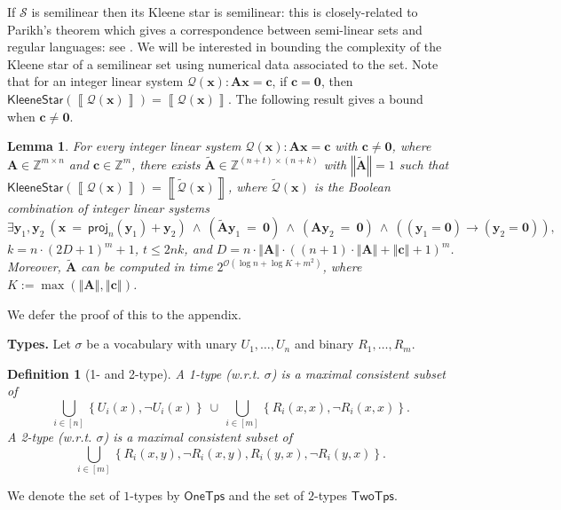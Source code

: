 \documentclass[10pt,a4paper]{article}
\newtheorem{lemma}[theorem]{Lemma}
\newtheorem{definition}[theorem]{Definition}
\theoremstyle{definition}
\theoremstyle{remark}
\newcommand{\myparagraph}[1]{\medskip\noindent \textbf{#1.}}
\newcommand{\cO}{\mathcal{O}}
\newcommand{\cQ}{\mathcal{Q}}
\newcommand{\cQtilde}{\tilde{\mathcal{Q}}}
\newcommand{\cS}{\mathcal{S}}
\newcommand{\bbZ}{\mathbb{Z}}
\newcommand{\bfA}{\mathbf{A}}
\newcommand{\bfAtilde}{\tilde{\mathbf{A}}}
\newcommand{\bfc}{\mathbf{c}}
\newcommand{\bfx}{\mathbf{x}}
\newcommand{\bfy}{\mathbf{y}}
\newcommand{\bfzero}{\mathbf{0}}
\newcommand{\vocab}{\sigma}
\newcommand{\twotypes}{\mathsf{TwoTps}}
\newcommand{\onetypes}{\mathsf{OneTps}}
\newcommand{\set}[1]         {\left\{ #1 \right\}}
\newcommand{\intsinterval}[1]{{\left[ #1 \right]}}
\newcommand{\norm}[1]        {\left\Vert #1 \right\Vert}
\newcommand{\projp}[2]     {\mathsf{proj}_{ #1 }\left( #2 \right)}
\newcommand{\kstar}[1] {\mathsf{KleeneStar}\left( #1 \right)}
\newcommand{\sol}[1] {\left\llbracket #1 \right\rrbracket}
\newcommand{\bigO}[1] {{\cO\left( #1 \right)}}
\begin{document}
If $\cS$ is semilinear then its Kleene star is semilinear: this is closely-related to Parikh's theorem which gives a correspondence between semi-linear sets and regular languages: see \cite{parikh,kleenestar}.
We will be interested in bounding the complexity of the Kleene star of a semilinear set using numerical data associated to the set.
Note that for an integer linear system $\cQ(\bfx): \bfA \bfx = \bfc$,
if $\bfc = \bfzero$, then $\kstar{\sol{\cQ(\bfx)}} = \sol{\cQ(\bfx)}$.
The following result gives a bound when $\bfc \neq \bfzero$.

\begin{lemma}\label{lem:key}
    For every integer linear system $\cQ(\bfx): \bfA \bfx = \bfc$ with $\bfc \neq \bfzero$,
    where $\bfA \in \bbZ^{m \times n}$ and $\bfc \in \bbZ^{m}$,
    there exists $\bfAtilde \in \bbZ^{(n+t) \times (n+k)}$ with $\norm{\bfAtilde} = 1$
    such that
    $\kstar{\sol{\cQ(\bfx)}} = \sol{\cQtilde(\bfx)}$,
    where $\cQtilde(\bfx)$ is the  Boolean combination of integer linear systems
    \begin{equation*}    
        \exists \bfy_1, \bfy_2\ 
        (\bfx\ =\ \projp{n}{\bfy_1} + \bfy_2)\ \land\ 
        (\bfAtilde\bfy_1\ =\ \bfzero)\ \land\ 
        (\bfA\bfy_2\ =\ \bfzero)\ \land\ 
        ((\bfy_1=\bfzero) \to (\bfy_2=\bfzero)),
    \end{equation*}
    $k = n\cdot(2D+1)^{m} + 1$,
    $t \le 2nk$, and
    $D = n \cdot \norm{\bfA} \cdot \left((n+1)\cdot \norm{\bfA} + \norm{\bfc} + 1\right)^{m}$.
    Moreover, $\bfAtilde$ can be computed in time $2^\bigO{\log n + \log K + m^2}$,
    where $K := \max\left(\norm{\bfA}, \norm{\bfc}\right)$.
\end{lemma}

We defer the proof of this to the appendix.


\myparagraph{Types}
Let $\vocab$ be a vocabulary with unary  $U_1, \ldots, U_n$ and binary  $R_1, \ldots, R_m$.
\begin{definition}[1- and 2-type]
    A \emph{1-type} (w.r.t. $\vocab$) is a maximal consistent subset of
    \begin{equation*}
        \bigcup_{i \in \intsinterval{n}}\set{U_i(x), \neg U_i(x)}
        \ \cup\ 
        \bigcup_{i \in \intsinterval{m}}\set{R_i(x, x), \neg R_i(x, x)}.
    \end{equation*}
    A \emph{2-type} (w.r.t. $\vocab$) is a maximal consistent subset of
    \begin{equation*}
        \bigcup_{i \in \intsinterval{m}}
        \set{R_i(x, y), \neg R_i(x, y), R_i(y, x), \neg R_i(y, x)}.
    \end{equation*}
\end{definition}
We denote the set of $1$-types  by $\onetypes$ and the set of $2$-types $\twotypes$.
\end{document}
